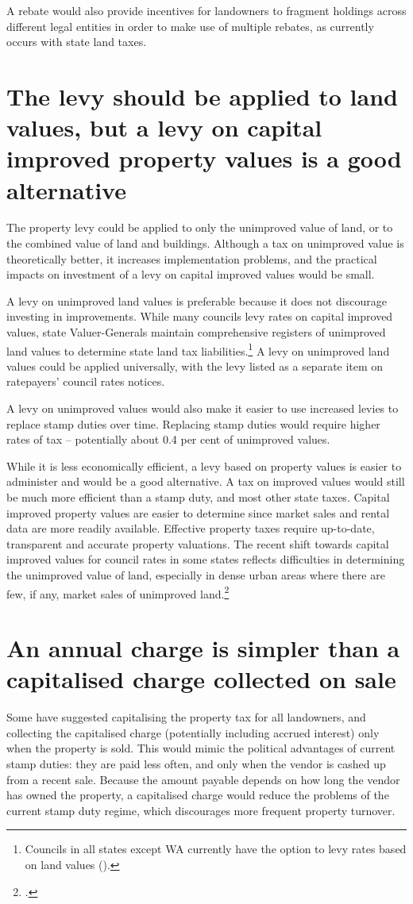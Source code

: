 A rebate would also provide incentives for landowners to fragment holdings across different legal entities in order to make use of multiple rebates, as currently occurs with state land taxes.

\section{\label{sec:PROP-6-3}The levy should be applied to land values, but a levy on capital improved property values is a good alternative}
The property levy could be applied to only the unimproved value of land, or to the combined value of land and buildings. Although a tax on unimproved value is theoretically better, it increases implementation problems, and the practical impacts on investment of a levy on capital improved values would be small.

A levy on unimproved land values is preferable because it does not discourage investing in improvements. While many councils levy rates on capital improved values, state Valuer-Generals maintain comprehensive registers of unimproved land values to determine state land tax liabilities.\footnote{Councils in all states except WA currently have the option to levy rates based on land values ().}  A levy on unimproved land values could be applied universally, with the levy listed as a separate item on ratepayers’ council rates notices.

A levy on unimproved values would also make it easier to use increased levies to replace stamp duties over time. Replacing stamp duties would require higher rates of tax – potentially about 0.4 per cent of unimproved values. 

While it is less economically efficient, a levy based on property values is easier to administer and would be a good alternative. A tax on improved values would still be much more efficient than a stamp duty, and most other state taxes. Capital improved property values are easier to determine since market sales and rental data are more readily available. Effective property taxes require up-to-date, transparent and accurate property valuations. The recent shift towards capital improved values for council rates in some states reflects difficulties in determining the unimproved value of land, especially in dense urban areas where there are few, if any, market sales of unimproved land.\footcites[][24]{Ombudsman2005}[][153]{HefferanBoyd2010}

\section{\label{sec:PROP-6-4}An annual charge is simpler than a capitalised charge collected on sale}
Some have suggested capitalising the property tax for all landowners, and collecting the capitalised charge (potentially including accrued interest) only when the property is sold.  This would mimic the political advantages of current stamp duties: they are paid less often, and only when the vendor is cashed up from a recent sale. Because the amount payable depends on how long the vendor has owned the property, a capitalised charge would reduce the problems of the current stamp duty regime, which discourages more frequent property turnover.

